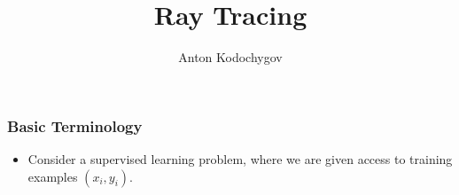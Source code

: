 \documentclass{beamer}
\begin{document}
\title {Ray Tracing}

\author {Anton Kodochygov}

\begin{frame}
\titlepage
\end{frame}

\begin{frame}
\frametitle{Basic Terminology}
\begin{itemize}

\item 
Consider a supervised learning problem, where we are given access to training examples $(x_i,y_i)$.

\end{itemize}
\end{frame}
\end{document}
